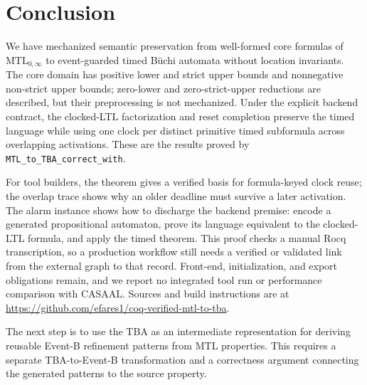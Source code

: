 \documentclass[10pt,journal,compsoc]{IEEEtran}
\begin{document}
\section{Conclusion}
We have mechanized semantic preservation from well-formed core formulas of
$\mathrm{MTL}_{0,\infty}$ to event-guarded timed B\"uchi automata without
location invariants. The core
domain has positive lower and strict upper bounds and nonnegative non-strict
upper bounds; zero-lower and zero-strict-upper reductions are described, but
their preprocessing is not mechanized. Under the explicit backend contract,
the clocked-LTL factorization and reset completion preserve the timed language
while using one clock per distinct primitive timed subformula across
overlapping activations. These are the results proved by
\texttt{MTL\_to\_TBA\_correct\_with}.

For tool builders, the theorem gives a verified basis for formula-keyed clock
reuse; the overlap trace shows why an older deadline must survive a later
activation. The alarm instance shows how to discharge the backend premise:
encode a generated propositional automaton, prove its language equivalent to
the clocked-LTL formula, and apply the timed theorem. This proof checks a
manual Rocq transcription, so a production workflow still needs a verified or
validated link from the external graph to that record. Front-end,
initialization, and export obligations remain, and we report no integrated
tool run or performance comparison with CASAAL. Sources and build
instructions are at
\url{https://github.com/efares1/coq-verified-mtl-to-tba}.

The next step is to use the TBA as an intermediate representation for deriving
reusable Event-B refinement patterns from MTL properties. This requires a
separate TBA-to-Event-B transformation and a correctness argument connecting
the generated patterns to the source property.



\end{document}
